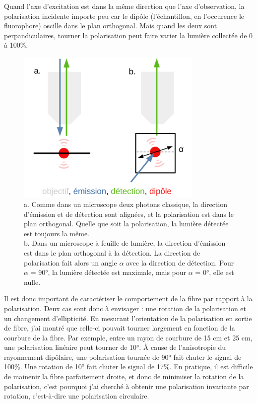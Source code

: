 Quand l'axe d'excitation est dans la même direction que l'axe d'observation, la polarisation incidente importe peu car le dipôle (l'échantillon, en l'occurence le fluorophore) oscille dans le plan orthogonal. Mais quand les deux sont perpandiculaires, tourner la polarisation peut faire varier la lumière collectée de 0 à 100\%.

\begin{figure}
\centering
\includegraphics[width=0.8\textwidth]{./files/polarization_plane.svg.png}
\caption{a. Comme dans un microscope deux photons classique, la direction d'émission et de détection sont alignées, et la polarisation est dans le plan orthogonal. Quelle que soit la polarisation, la lumière détectée est toujours la même.
\\ b. Dans un microscope à feuille de lumière, la direction d'émission est dans le plan orthogonal à la détection. La direction de polarisation fait alors un angle $\alpha$ avec la direction de détection. Pour $\alpha$ = 90°, la lumière détectée est maximale, mais pour $\alpha$ = 0°, elle est nulle.}
\end{figure}


Il est donc important de caractériser le comportement de la fibre par rapport à la polarisation. Deux cas sont donc à envisager : une rotation de la polarisation et un changement d'ellipticité. En mesurant l'orientation de la polarisation en sortie de fibre, j'ai montré que celle-ci pouvait tourner largement en fonction de la courbure de la fibre. Par exemple, entre un rayon de courbure de 15 cm et 25 cm, une polarisation linéaire peut tourner de 10°. À cause de l'anisotropie du rayonnement dipôlaire, une polarisation tournée de 90° fait chuter le signal de 100\%. Une rotation de 10° fait chuter le signal de 17\%. En pratique, il est difficile de mainenir la fibre parfaitement droite, et donc de minimiser la rotation de la polarisation, c'est pourquoi j'ai cherché à obtenir une polarisation invariante par rotation, c'est-à-dire une polarisation circulaire.


